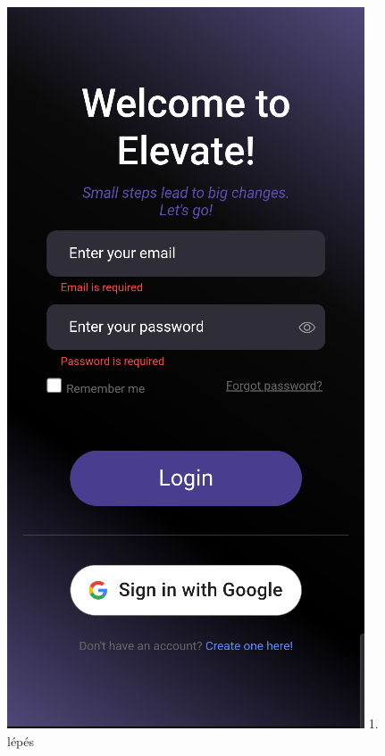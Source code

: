 \documentclass[12pt]{report}
\begin{document}
\begin{figure}[H]
\begin{minipage}[b]{0.23\textwidth}
        \includegraphics[width=\linewidth]{src/loginpage1.png}
       1. lépés
    \end{minipage}
    \hfill
    \begin{minipage}[b]{0.23\textwidth}

\end{minipage}
\end{figure}
\end{document}
